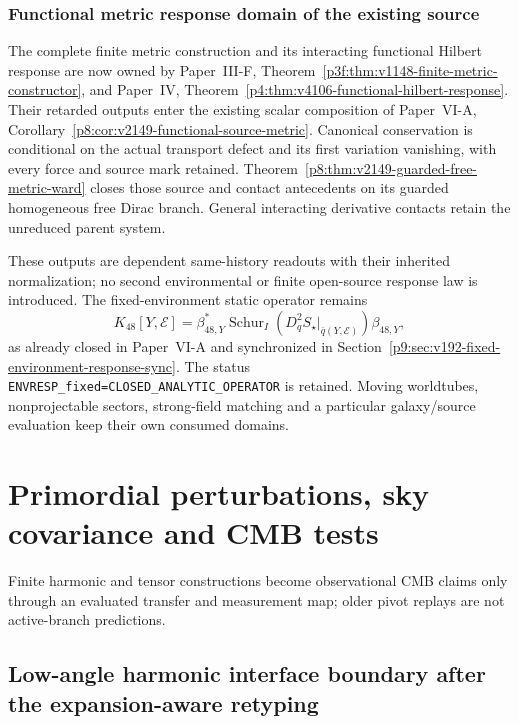 \documentclass[12pt,a4paper]{article}
\begin{document}
\subsubsection{Functional metric response domain of the existing source}
\label{p9:sec:v1112-functional-metric-handoff}
The complete finite metric construction and its interacting functional
Hilbert response are now owned by Paper~III-F,
Theorem~\ref{p3f:thm:v1148-finite-metric-constructor}, and Paper~IV,
Theorem~\ref{p4:thm:v4106-functional-hilbert-response}.
Their retarded outputs enter the existing scalar composition of Paper~VI-A,
Corollary~\ref{p8:cor:v2149-functional-source-metric}.
Canonical conservation is conditional on the actual transport defect and
its first variation vanishing, with every force and source mark retained.
Theorem~\ref{p8:thm:v2149-guarded-free-metric-ward} closes those source
and contact antecedents on its guarded homogeneous free Dirac branch.
General interacting derivative contacts retain the unreduced parent system.

These outputs are dependent same-history readouts with their inherited
normalization; no second environmental or finite open-source response
law is introduced. The fixed-environment static operator remains
\[
 K_{48}[Y,\mathcal E]=\beta_{48,Y}^*
       \operatorname{Schur}_{I}
       (D_q^2S_\star|_{\bar q(Y,\mathcal E)})\beta_{48,Y},
\]
as already closed in Paper~VI-A and synchronized in
Section~\ref{p9:sec:v192-fixed-environment-response-sync}.
The status \texttt{ENVRESP\_fixed=CLOSED\_ANALYTIC\_OPERATOR} is retained.
Moving worldtubes, nonprojectable sectors, strong-field matching and a
particular galaxy/source evaluation keep their own consumed domains.





\section{Primordial perturbations, sky covariance and CMB tests}
\label{p6b:sec:organized-b2}
Finite harmonic and tensor constructions become observational CMB claims only through an evaluated transfer and measurement map; older pivot replays are not active-branch predictions.

\subsection{Low-angle harmonic interface boundary after the expansion-aware retyping}
\label{p9:sec:v191-lowell-interface-boundary}
\end{document}
